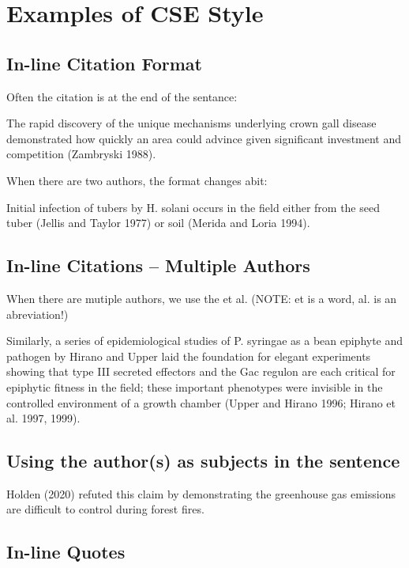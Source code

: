 \documentclass{article}\usepackage[]{graphicx}\usepackage[]{color}
\begin{document}
\section{Examples of CSE Style}

\subsection{In-line Citation Format}

\noindent Often the citation is at the end of the sentance: 

The rapid discovery of the unique mechanisms underlying crown gall disease demonstrated how quickly an area could advince given significant investment and competition (Zambryski 1988).

\noindent When there are two authors, the format changes abit: 

Initial infection of tubers by H. solani occurs in the field either from the seed tuber (Jellis and Taylor 1977) or soil (Merida and Loria 1994).

\subsection{In-line Citations -- Multiple Authors}

\noindent When there are mutiple authors, we use the et al. (NOTE: et is a word, al. is an abreviation!)

Similarly, a series of epidemiological studies of P. syringae as a bean epiphyte and pathogen by Hirano and Upper laid the foundation for elegant experiments showing that type III secreted effectors and the Gac regulon are each critical for epiphytic fitness in the field; these important phenotypes were invisible in the controlled environment of a growth chamber (Upper and Hirano 1996; Hirano et al. 1997, 1999).

\subsection{Using the author(s) as subjects in the sentence}

Holden (2020) refuted this claim by demonstrating the greenhouse gas emissions are difficult to control during forest fires.

\subsection{In-line Quotes}
\end{document}
